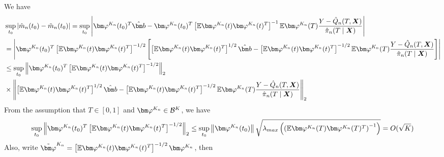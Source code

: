 We have
\begin{equation}\label{eq_appendix:consistency_term1}
    \begin{split}
        &\sup_{t_0}\left|\hat m_n(t_0)-\tilde m_n(t_0)\right|
        =\sup_{t_0}\left|\vpk(t_0)^T\hbb-\vpk(t_0)^T\left[\E\vpk(t)\vpk(t)^T\right]^{-1}\E\vpk(T)\frac{Y-\hqn(T,\X)}{\hpin(T\mid\X)}\right|
        \\&=\left|\vpk(t_0)^T\left[\E\vpk(t)\vpk(t)^T\right]^{-1/2}\left[\left[\E\vpk(t)\vpk(t)^T\right]^{1/2}\hbb-\left[\E\vpk(t)\vpk(t)^T\right]^{-1/2}\E\vpk(T)\frac{Y-\hqn(T,\X)}{\hpin(T\mid\X)}\right]\right|
        \\&\leq \sup_{t_0}\left\|\vpk(t_0)^T\left[\E\vpk(t)\vpk(t)^T\right]^{-1/2}\right\|_2
        \\&\times
        \left\|\left[\E\vpk(t)\vpk(t)^T\right]^{1/2}\hbb-\left[\E\vpk(t)\vpk(t)^T\right]^{-1/2}\E\vpk(T)\frac{Y-\hqn(T,\X)}{\hpin(T\mid\X)}\right\|_2
    \end{split}
\end{equation}
From the assumption that $T\in[0,1]$ and $\vpk\in\mathcal{B}^{K}$, we have
\begin{equation}\label{eq_appendix:consistency_term1_add1}
    \begin{split}
        \sup_{t_0}\left\|\vpk(t_0)^T\left[\E\vpk(t)\vpk(t)^T\right]^{-1/2}\right\|_2
        \leq
        \sup_{t_0}\left\|\vpk(t_0)\right\|\sqrt{\lambda_{max}\left(\left(\E\vpk(T)\vpk(T)^T\right)^{-1}\right)}
        =\O(\sqrt{K})
    \end{split}
\end{equation}
Also, write $\tildevpk=\left[\E\vpk(t)\vpk(t)^T\right]^{-1/2}\vpk$, then
